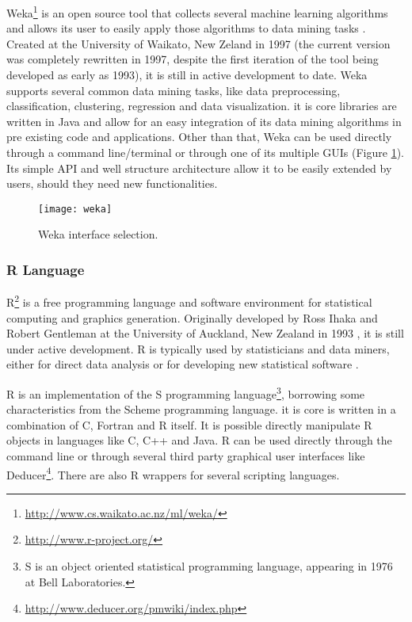 Weka\footnote{\url{http://www.cs.waikato.ac.nz/ml/weka/}} is an open source tool that
collects several machine learning algorithms and allows its user to easily apply
those algorithms to data mining tasks \cite{Hall}. Created at the University of
Waikato, New Zeland in 1997 (the current version was completely rewritten in
1997, despite the first iteration of the tool being developed as early as 1993),
it is still in active development to date. Weka supports several common data
mining tasks, like data preprocessing, classification, clustering, regression
and data visualization. it is core libraries are written in Java and allow for an
easy integration of its data mining algorithms in pre existing code and
applications. Other than that, Weka can be used directly through a command
line/terminal or through one of its multiple GUIs (Figure \ref{fig:weka}). Its
simple API and well structure architecture allow it to be easily extended by
users, should they need new functionalities.

\begin{figure}[!htb]
  \begin{center}
    \leavevmode
    \texttt{[image: weka]}
    \caption[Weka interface selection]{Weka interface selection.}
    \label{fig:weka}
  \end{center}
\end{figure}

\subsubsection*{R Language}

R\footnote{\url{http://www.r-project.org/}} is a free programming language and
software environment for statistical computing and graphics generation.
Originally developed by Ross Ihaka and Robert Gentleman at the University of
Auckland, New Zealand in 1993 \cite{Ihaka1998}, it is still under active
development. R is typically used by statisticians and data miners, either for
direct data analysis or for developing new statistical software \cite{Fox2005}.

R is an implementation of the S programming language\footnote{S is an object
oriented statistical programming language, appearing in 1976 at Bell
Laboratories.}, borrowing some characteristics from the Scheme programming
language. it is core is written in a combination of C, Fortran and R itself. It
is possible directly manipulate R objects in languages like C, C++ and Java. R
can be used directly through the command line or through several third party
graphical user interfaces like
Deducer\footnote{\url{http://www.deducer.org/pmwiki/index.php}}. There are also
R wrappers for several scripting languages.

